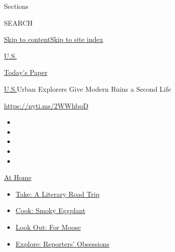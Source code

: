 Sections

SEARCH

\protect\hyperlink{site-content}{Skip to
content}\protect\hyperlink{site-index}{Skip to site index}

\href{https://www.nytimes3xbfgragh.onion/section/us}{U.S.}

\href{https://myaccount.nytimes3xbfgragh.onion/auth/login?response_type=cookie\&client_id=vi}{}

\href{https://www.nytimes3xbfgragh.onion/section/todayspaper}{Today's
Paper}

\href{/section/us}{U.S.}\textbar{}Urban Explorers Give Modern Ruins a
Second Life

\url{https://nyti.ms/2WWhbqD}

\begin{itemize}
\item
\item
\item
\item
\item
\end{itemize}

\href{https://www.nytimes3xbfgragh.onion/spotlight/at-home?action=click\&pgtype=Article\&state=default\&region=TOP_BANNER\&context=at_home_menu}{At
Home}

\begin{itemize}
\tightlist
\item
  \href{https://www.nytimes3xbfgragh.onion/2020/07/28/books/time-for-a-literary-road-trip.html?action=click\&pgtype=Article\&state=default\&region=TOP_BANNER\&context=at_home_menu}{Take:
  A Literary Road Trip}
\item
  \href{https://www.nytimes3xbfgragh.onion/2020/07/29/magazine/bored-with-your-home-cooking-some-smoky-eggplant-will-fix-that.html?action=click\&pgtype=Article\&state=default\&region=TOP_BANNER\&context=at_home_menu}{Cook:
  Smoky Eggplant}
\item
  \href{https://www.nytimes3xbfgragh.onion/2020/07/27/travel/moose-michigan-isle-royale.html?action=click\&pgtype=Article\&state=default\&region=TOP_BANNER\&context=at_home_menu}{Look
  Out: For Moose}
\item
  \href{https://www.nytimes3xbfgragh.onion/interactive/2020/at-home/even-more-reporters-editors-diaries-lists-recommendations.html?action=click\&pgtype=Article\&state=default\&region=TOP_BANNER\&context=at_home_menu}{Explore:
  Reporters' Obsessions}
\end{itemize}

